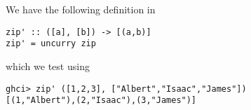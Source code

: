 
We have the following definition in 
\begin{verbatim}
zip' :: ([a], [b]) -> [(a,b)]
zip' = uncurry zip
\end{verbatim}
which we test using
\begin{verbatim}
ghci> zip' ([1,2,3], ["Albert","Isaac","James"])
[(1,"Albert"),(2,"Isaac"),(3,"James")]
\end{verbatim}
